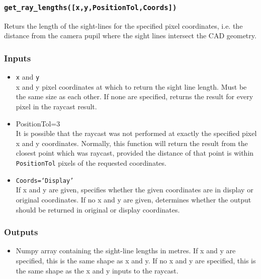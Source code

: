 \documentclass[12pt]{article}
\newcommand{\code}[1]{\texttt{#1}}
\begin{document}
\subsubsection*{\code{get\_ray\_lengths([x,y,PositionTol,Coords])}}
\begin{adjustwidth}{0.5cm}{0cm}
Returs the length of the sight-lines for the specified pixel coordinates, i.e. the distance from the camera pupil where the sight lines intersect the CAD geometry.
\subsubsection*{Inputs}
\begin{itemize}
\item{\code{x} and \code{y}\\x and y pixel coordinates at which to return the sight line length. Must be the same size as each other. If none are specified, returns the result for every pixel in the raycast result.}
\item{PositionTol=3\\It is possible that the raycast was not performed at exactly the specified pixel x and y coordinates. Normally, this function will return the result from the closest point which was raycast, provided the distance of that point is within \code{PositionTol} pixels of the requested coordinates.}
\item{\code{Coords=`Display'}\\ If x and y are given, specifies whether the given coordinates are in display or original coordinates. If no x and y are given, determines whether the output should be returned in original or display coordinates.}
\end{itemize}
\subsubsection*{Outputs}
\begin{itemize}
\item{Numpy array containing the sight-line lengths in metres. If x and y are specified, this is the same shape as x and y. If no x and y are specified, this is the same shape as the x and y inputs to the raycast.}
\end{itemize}
\end{adjustwidth}
\end{document}
